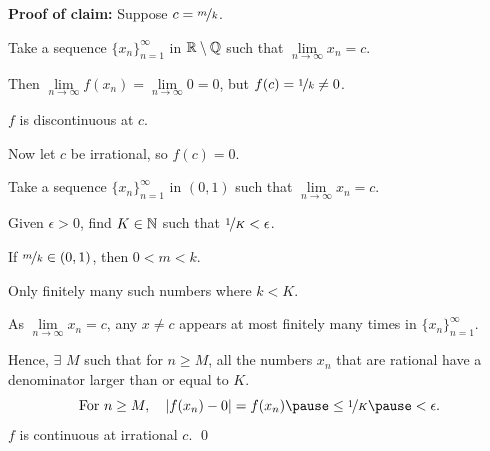 \documentclass[10pt,aspectratio=169]{beamer}
\begin{document}
\begin{frame}

\textbf{Proof of claim:}
Suppose $c = \nicefrac{m}{k}$.

\pause
Take a sequence $\{ x_n \}_{n=1}^\infty$ in ${\mathbb{R}} \setminus {\mathbb{Q}}$ such that
$\lim\limits_{n\to\infty} x_n = c$.

\pause
Then $\lim\limits_{n\to\infty} f(x_n) = \lim\limits_{n\to\infty} 0 = 0$, but $f(c) = \nicefrac{1}{k} \not= 0$.

\pause
\thus \quad $f$ is discontinuous at $c$.

\pause
\medskip

Now let $c$ be irrational, so $f(c) = 0$.

\pause
Take a sequence $\{ x_n \}_{n=1}^\infty$ in $(0,1)$ such that
$\lim\limits_{n\to\infty} x_n = c$.

\pause
Given $\epsilon > 0$, find $K \in {\mathbb{N}}$ such that $\nicefrac{1}{K} < \epsilon$.

\pause
If $\nicefrac{m}{k} \in (0,1)$, then $0 < m < k$.

\pause
Only finitely many such numbers where $k < K$.

\pause
As $\lim\limits_{n\to\infty} x_n = c$, any $x \not= c$ appears at most
finitely many times in $\{ x_n \}_{n=1}^\infty$.

\pause
Hence,
$\exists$ $M$ such that for $n \geq M$, all the numbers $x_n$
that are rational
have a denominator larger than or equal to $K$.
\pause
\begin{equation*}
\text{For } n \geq M, \quad
\abs{f(x_n) - 0} = f(x_n)
\pause
\leq \nicefrac{1}{K}
\pause
< \epsilon .
\end{equation*}
\pause
\thus \quad $f$ is continuous at irrational $c$.
\qed

\end{frame}
\end{document}
